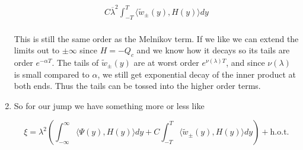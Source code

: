 \documentclass[12pt]{article}
\begin{document}
\begin{enumerate}
\begin{align*} 
C \overline{\lambda}^2 \int_{-T}^T \langle \tilde{w}_\pm(y), H(y) \rangle dy \\
\end{align*}

This is still the same order as the Melnikov term. If we like we can extend the limits out to $\pm \infty$ since $H = -Q_c$ and we know how it decays so its tails are order $e^{-\alpha T}$. The tails of $\tilde{w}_\pm(y)$ are at worst order $e^{\nu(\lambda)T}$, and since $\nu(\lambda)$ is small compared to $\alpha$, we still get exponential decay of the inner product at both ends. Thus the tails can be tossed into the higher order terms.\\ 

\item So for our jump we have something more or less like

\[
\xi = \lambda^2 \left( \int_{-\infty}^\infty \langle \Psi(y), H(y) \rangle dy + C \int_{-T}^T \langle \tilde{w}_\pm(y), H(y) \rangle dy \right) + \text{h.o.t.}
\]

\end{enumerate}
\end{document}
